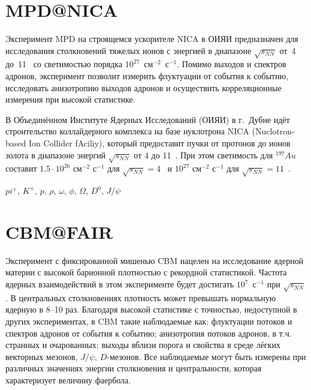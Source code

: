 
\section{MPD@NICA}

Эксперимент MPD на строящемся ускорителе NICA в ОИЯИ предназначен для исследования столкновений тяжелых ионов с энергией в диапазоне $\sqrt{s_{NN}}$ от~4 до~11~\GeVperNucl{} со светимостью порядка $10^{27}$~см$^{-2}$~с$^{-1}$. Помимо выходов и спектров адронов, эксперимент позволит измерить флуктуации от события к событию, исследовать анизотропию выходов адронов и осуществить корреляционные измерения при высокой статистике.


В Объединённом Институте Ядерных Исследований (ОИЯИ) в г.~Дубне идёт строительство коллайдерного комплекса на базе нуклотрона NICA (Nuclotron-based Ion Collider fAciliy), который предоставит пучки от протонов до ионов золота в диапазоне энергий $\sqrt{s_{NN}}$ от 4 до 11~\GeVperNucl. При этом светимость для $^{197}Au$ составит $1.5 \cdot 10^{26}$ см$^{-2}$ с$^{-1}$ для $\sqrt{s_{NN}}=4$~\GeVperNucl{} и $10^{27}$ см$^{-2}$ с$^{-1}$ для $\sqrt{s_{NN}}=11$~\GeVperNucl.



$pi^{+}$, $K^{+}$, $p$, $\rho$, $\omega$, $\phi$, $\Omega$, $D^{0}$, $J/\psi$




\section{CBM@FAIR}

Эксперимент с фиксированной мишенью CBM нацелен на исследование ядерной материи с высокой барионной плотностью с рекордной статистикой. Частота ядерных взаимодействий в этом эксперименте будет достигать $10^7$~с$^{-1}$ при $\sqrt{s_{NN}}$ \todo. В центральных столкновениях плотность может превышать нормальную ядерную в 8--10 раз. Благодаря высокой статистике с точностью, недоступной в других экспериментах, в CBM \todo такие наблюдаемые как: флуктуации потоков и спектров адронов от события к событию; анизотропия потоков адронов, в т.ч. странных и очарованных; выходы вблизи порога и свойства в среде лёгких векторных мезонов, $J/\psi$, $D$-мезонов. Все наблюдаемые могут быть измерены при различных значениях энергии столкновения и центральности, которая характеризует величину фаербола.

